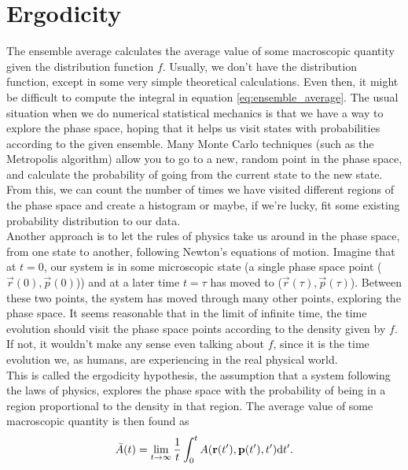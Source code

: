\section{Ergodicity}
\label{sec:kinetic_theory_ergodicity}
The ensemble average calculates the average value of some macroscopic quantity given the distribution function $f$. Usually, we don't have the distribution function, except in some very simple theoretical calculations. Even then, it might be difficult to compute the integral in equation \eqref{eq:ensemble_average}. The usual situation when we do numerical statistical mechanics is that we have a way to explore the phase space, hoping that it helps us visit states with probabilities according to the given ensemble. Many Monte Carlo techniques (such as the Metropolis algorithm) allow you to go to a new, random point in the phase space, and calculate the probability of going from the current state to the new state. From this, we can count the number of times we have visited different regions of the phase space and create a histogram or maybe, if we're lucky, fit some existing probability distribution to our data.\\
Another approach is to let the rules of physics take us around in the phase space, from one state to another, following Newton's equations of motion. Imagine that at $t=0$, our system is in some microscopic state (a single phase space point ($\vec r(0), \vec p(0)$)) and at a later time $t=\tau$ has moved to ($\vec r(\tau), \vec p(\tau)$). Between these two points, the system has moved through many other points, exploring the phase space. It seems reasonable that in the limit of infinite time, the time evolution should visit the phase space points according to the density given by $f$. If not, it wouldn't make any sense even talking about $f$, since it is the time evolution we, as humans, are experiencing in the real physical world.\\
This is called the ergodicity hypothesis, the assumption that a system following the laws of physics, explores the phase space with the probability of being in a region proportional to the density in that region. The average value of some macroscopic quantity is then found as
\begin{align}
	\bar A(t) = \lim_{t\rightarrow \infty} \frac{1}{t}\int_0^{t} A(\mathbf r(t'), \mathbf p(t'), t')\mathrm{d}t'.
\end{align}